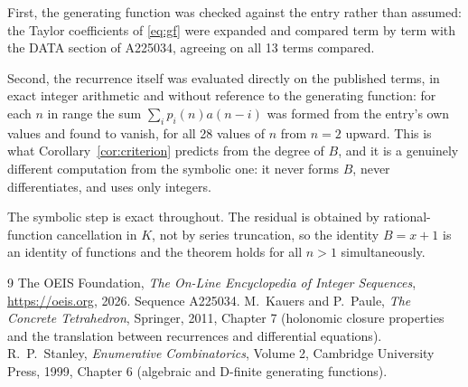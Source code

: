 \documentclass[11pt,a4paper]{article}
\theoremstyle{plain}
\theoremstyle{definition}
\begin{document}
First, the generating function was checked against the entry rather than assumed: the
Taylor coefficients of \eqref{eq:gf} were expanded and compared term by term with the DATA
section of A225034, agreeing on all 13 terms compared.

Second, the recurrence itself was evaluated directly on the published terms, in exact
integer arithmetic and without reference to the generating function: for each $n$ in range
the sum $\sum_{i}p_{i}(n)a(n-i)$ was formed from the entry's own values and found to
vanish, for all 28 values of $n$ from $n=2$ upward. This is what
Corollary~\ref{cor:criterion} predicts from the degree of $B$, and it is a genuinely
different computation from the symbolic one: it never forms $B$, never differentiates, and
uses only integers.

The symbolic step is exact throughout. The residual is obtained by rational-function
cancellation in $K$, not by series truncation, so the identity $B=x + 1$ is an
identity of functions and the theorem holds for all $n>1$ simultaneously.

\begin{thebibliography}{9}
 The OEIS Foundation, \emph{The On-Line Encyclopedia of Integer Sequences},
\url{https://oeis.org}, 2026. Sequence A225034.
 M.~Kauers and P.~Paule, \emph{The Concrete Tetrahedron}, Springer, 2011,
Chapter 7 (holonomic closure properties and the translation between recurrences and
differential equations).
 R.~P.~Stanley, \emph{Enumerative Combinatorics}, Volume 2, Cambridge
University Press, 1999, Chapter 6 (algebraic and D-finite generating functions).
\end{thebibliography}
\end{document}

